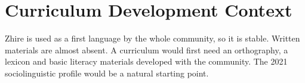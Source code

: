 \documentclass[12pt]{article}
\begin{document}
\section{Curriculum Development Context}
Zhire is used as a first language by the whole community, so it is stable. Written materials are almost absent. A curriculum would first need an orthography, a lexicon and basic literacy materials developed with the community. The 2021 sociolinguistic profile would be a natural starting point.
\end{document}
